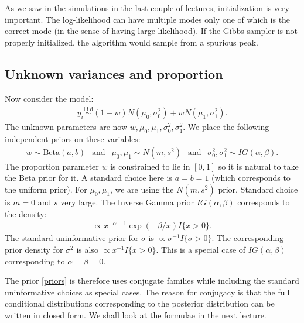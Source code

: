 \documentclass{scrartcl}
\begin{document}
As we saw in the simulations in the last couple of lectures,
initialization is very important. The log-likelihood can have multiple
modes only one of which is the correct mode (in the sense of having
large likelihood). If the Gibbs sampler is not properly initialized,
the algorithm would sample from a spurious peak.

\subsection{Unknown variances and proportion}

Now consider the model:  
\begin{align*}
  y_i \overset{\text{i.i.d}}{\sim} (1 - w) N(\mu_0, \sigma_0^2) + w
  N(\mu_1, \sigma_1^2). 
\end{align*}
The unknown parameters are now $w, \mu_0, \mu_1, \sigma^2_0,
\sigma_1^2$. We place the following independent priors on these
variables: 
\begin{align}\label{priors}
  w \sim \text{Beta}(a, b)~~ \text{ and } ~~ \mu_0, \mu_1 \sim N(m,
  s^2) ~~ \text{ and } ~~
  \sigma_0^2, \sigma_1^2 \sim IG(\alpha, \beta). 
\end{align}
The proportion parameter $w$ is constrained to lie in $[0, 1]$ so it
is natural to take the Beta prior for it. A standard choice here is $a
= b = 1$ (which corresponds to the uniform prior). For $\mu_0, \mu_1$,
we are using the $N(m, s^2)$ prior. Standard choice is $m = 0$ and $s$
very large. The Inverse Gamma prior $IG(\alpha, \beta)$ corresponds to
the density:
\begin{align*}
  \propto x^{-\alpha - 1} \exp(-\beta/x) I\{x > 0\}. 
\end{align*}
The standard uninformative prior for $\sigma$ is $\propto \sigma^{-1}
I\{\sigma > 0\}$. The corresponding prior density for $\sigma^2$
is also $\propto x^{-1} I\{x > 0\}$. This is a special case of
$IG(\alpha, \beta)$ corresponding to $\alpha = \beta = 0$.

The prior \eqref{priors} is therefore uses conjugate families while
including the standard uninformative choices as special cases. The
reason for conjugacy is that the full conditional distributions
corresponding to the posterior distribution can be written in closed
form. We shall look at the formulae in the next lecture. 


\end{document}
